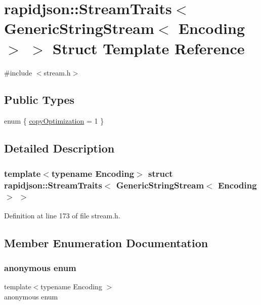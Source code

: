 \hypertarget{structrapidjson_1_1_stream_traits_3_01_generic_string_stream_3_01_encoding_01_4_01_4}{}\section{rapidjson\+::Stream\+Traits$<$ Generic\+String\+Stream$<$ Encoding $>$ $>$ Struct Template Reference}
\label{structrapidjson_1_1_stream_traits_3_01_generic_string_stream_3_01_encoding_01_4_01_4}


{\ttfamily \#include $<$stream.\+h$>$}

\subsection*{Public Types}
\begin{DoxyCompactItemize}
\item 
enum \{ \mbox{\hyperlink{structrapidjson_1_1_stream_traits_3_01_generic_string_stream_3_01_encoding_01_4_01_4_a421f511cdadd65681fe51ba0dde1b649a58160aabefa22129afe0dd6dce3285f9}{copy\+Optimization}} = 1
 \}
\end{DoxyCompactItemize}


\subsection{Detailed Description}
\subsubsection*{template$<$typename Encoding$>$\newline
struct rapidjson\+::\+Stream\+Traits$<$ Generic\+String\+Stream$<$ Encoding $>$ $>$}



Definition at line 173 of file stream.\+h.



\subsection{Member Enumeration Documentation}
\mbox{\label{structrapidjson_1_1_stream_traits_3_01_generic_string_stream_3_01_encoding_01_4_01_4_a421f511cdadd65681fe51ba0dde1b649}} 
\subsubsection{\texorpdfstring{anonymous enum}{anonymous enum}}
{\footnotesize\ttfamily template$<$typename Encoding $>$ \\
anonymous enum}

